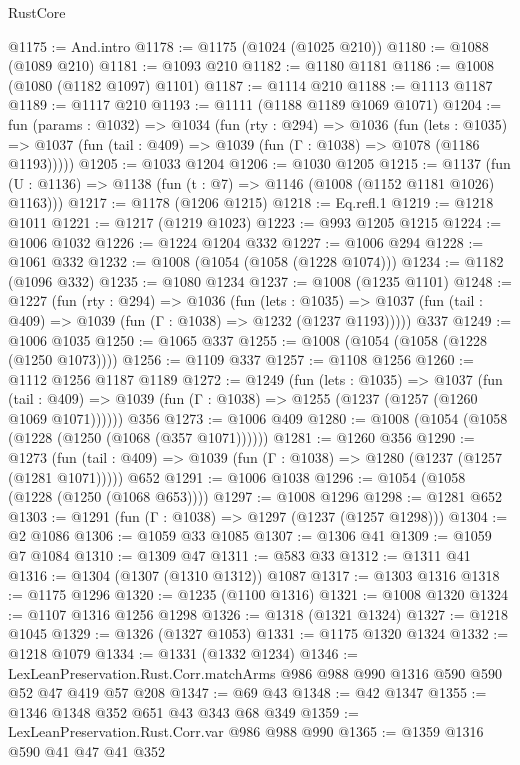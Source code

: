 \begin{lexlean}{RustCore}
\begin{coremodule}
@1175 := And.intro
@1178 := @1175 (@1024 (@1025 @210))
@1180 := @1088 (@1089 @210)
@1181 := @1093 @210
@1182 := @1180 @1181
@1186 := @1008 (@1080 (@1182 @1097) @1101)
@1187 := @1114 @210
@1188 := @1113 @1187
@1189 := @1117 @210
@1193 := @1111 (@1188 @1189 @1069 @1071)
@1204 := fun (params : @1032) =>
  @1034
    (fun (rty : @294) =>
    @1036
      (fun (lets : @1035) =>
      @1037 (fun (tail : @409) => @1039 (fun (Γ : @1038) => @1078 (@1186 @1193)))))
@1205 := @1033 @1204
@1206 := @1030 @1205
@1215 := @1137 (fun (U : @1136) => @1138 (fun (t : @7) => @1146 (@1008 (@1152 @1181 @1026) @1163)))
@1217 := @1178 (@1206 @1215)
@1218 := Eq.refl.{1}
@1219 := @1218 @1011
@1221 := @1217 (@1219 @1023)
@1223 := @993 @1205 @1215
@1224 := @1006 @1032
@1226 := @1224 @1204 @332
@1227 := @1006 @294
@1228 := @1061 @332
@1232 := @1008 (@1054 (@1058 (@1228 @1074)))
@1234 := @1182 (@1096 @332)
@1235 := @1080 @1234
@1237 := @1008 (@1235 @1101)
@1248 := @1227
    (fun (rty : @294) =>
    @1036
      (fun (lets : @1035) =>
      @1037 (fun (tail : @409) => @1039 (fun (Γ : @1038) => @1232 (@1237 @1193)))))
    @337
@1249 := @1006 @1035
@1250 := @1065 @337
@1255 := @1008 (@1054 (@1058 (@1228 (@1250 @1073))))
@1256 := @1109 @337
@1257 := @1108 @1256
@1260 := @1112 @1256 @1187 @1189
@1272 := @1249
    (fun (lets : @1035) =>
    @1037
      (fun (tail : @409) => @1039 (fun (Γ : @1038) => @1255 (@1237 (@1257 (@1260 @1069 @1071))))))
    @356
@1273 := @1006 @409
@1280 := @1008 (@1054 (@1058 (@1228 (@1250 (@1068 (@357 @1071))))))
@1281 := @1260 @356
@1290 := @1273
    (fun (tail : @409) => @1039 (fun (Γ : @1038) => @1280 (@1237 (@1257 (@1281 @1071)))))
    @652
@1291 := @1006 @1038
@1296 := @1054 (@1058 (@1228 (@1250 (@1068 @653))))
@1297 := @1008 @1296
@1298 := @1281 @652
@1303 := @1291 (fun (Γ : @1038) => @1297 (@1237 (@1257 @1298)))
@1304 := @2 @1086
@1306 := @1059 @33 @1085
@1307 := @1306 @41
@1309 := @1059 @7 @1084
@1310 := @1309 @47
@1311 := @583 @33
@1312 := @1311 @41
@1316 := @1304 (@1307 (@1310 @1312)) @1087
@1317 := @1303 @1316
@1318 := @1175 @1296
@1320 := @1235 (@1100 @1316)
@1321 := @1008 @1320
@1324 := @1107 @1316 @1256 @1298
@1326 := @1318 (@1321 @1324)
@1327 := @1218 @1045
@1329 := @1326 (@1327 @1053)
@1331 := @1175 @1320 @1324
@1332 := @1218 @1079
@1334 := @1331 (@1332 @1234)
@1346 := LexLeanPreservation.Rust.Corr.matchArms
    @986
    @988
    @990
    @1316
    @590
    @590
    @52
    @47
    @419
    @57
    @208
@1347 := @69 @43
@1348 := @42 @1347
@1355 := @1346 @1348 @352 @651 @43 @343 @68 @349
@1359 := LexLeanPreservation.Rust.Corr.var @986 @988 @990
@1365 := @1359 @1316 @590 @41 @47 @41 @352

\end{coremodule}
\end{lexlean}
